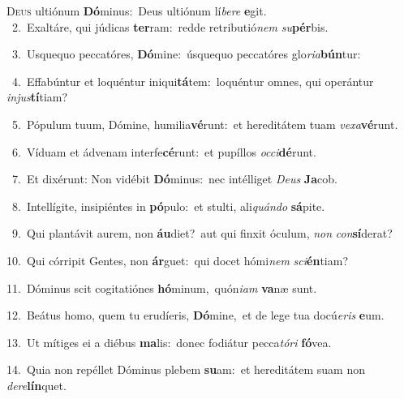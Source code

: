 \lettrine{\initial\textcolor{\initialcolor}{D}}{eus} ultiónum \textbf{Dó}\-minus:~\star Deus ultiónum lí\-\textit{be}\-\textit{re} \textbf{e}\-git.\\
{\numbfont\textcolor{\numbcolor}{~2.}}~Exaltáre, qui júdicas \textbf{ter}\-ram:~\star redde retributió\textit{nem} \textit{su}\-\textbf{pér}bis.\par
{\numbfont\textcolor{\numbcolor}{~3.}}~Usquequo peccatóres, \textbf{Dó}\-mine:~\star úsquequo peccatóres glo\-\textit{ri}\-\textit{a}\textbf{bún}tur:\par
{\numbfont\textcolor{\numbcolor}{~4.}}~Effabúntur et loquéntur iniqui\-\textbf{tá}\-tem:~\star loquéntur omnes, qui operántur \textit{in}\-\textit{jus}\textbf{tí}tiam?\par
{\numbfont\textcolor{\numbcolor}{~5.}}~Pópulum tuum, Dómine, humilia\-\textbf{vé}\-runt:~\star et hereditátem tuam \textit{ve}\-\textit{xa}\textbf{vé}runt.\par
{\numbfont\textcolor{\numbcolor}{~6.}}~Víduam et ádvenam interfe\-\textbf{cé}\-runt:~\star et pupíllos \textit{oc}\-\textit{ci}\textbf{dé}runt.\par
{\numbfont\textcolor{\numbcolor}{~7.}}~Et dixérunt: Non vidébit \textbf{Dó}\-minus:~\star nec intélliget \textit{De}\-\textit{us} \textbf{Ja}\-cob.\par
{\numbfont\textcolor{\numbcolor}{~8.}}~Intellígite, insipiéntes in \textbf{pó}\-pulo:~\star et stulti, ali\-\textit{quán}\-\textit{do} \textbf{sá}\-pite.\par
{\numbfont\textcolor{\numbcolor}{~9.}}~Qui plantávit aurem, non \textbf{áu}\-diet?~\star aut qui finxit óculum, \textit{non} \textit{con}\-\textbf{sí}derat?\par
{\numbfont\textcolor{\numbcolor}{10.}}~Qui córripit Gentes, non \textbf{ár}\-guet:~\star qui docet hómi\textit{nem} \textit{sci}\-\textbf{én}tiam?\par
{\numbfont\textcolor{\numbcolor}{11.}}~Dóminus scit cogitatiónes \textbf{hó}\-minum,~\star quón\-\textit{i}\-\textit{am} \textbf{va}\-næ sunt.\par
{\numbfont\textcolor{\numbcolor}{12.}}~Beátus homo, quem tu erudíeris, \textbf{Dó}\-mine,~\star et de lege tua docú\-\textit{e}\-\textit{ris} \textbf{e}\-um.\par
{\numbfont\textcolor{\numbcolor}{13.}}~Ut mítiges ei a diébus \textbf{ma}\-lis:~\star donec fodiátur pecca\-\textit{tó}\-\textit{ri} \textbf{fó}\-vea.\par
{\numbfont\textcolor{\numbcolor}{14.}}~Quia non repéllet Dóminus plebem \textbf{su}\-am:~\star et hereditátem suam non \textit{de}\-\textit{re}\textbf{lín}quet.\par
